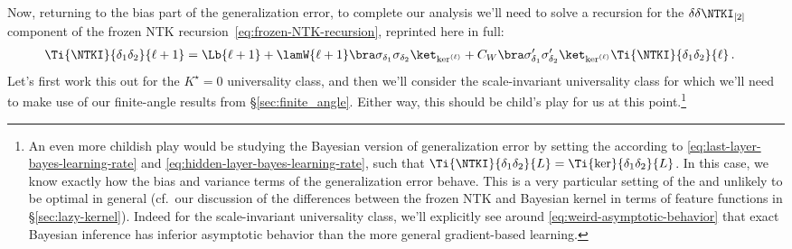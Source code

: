 Now, returning to the bias part of the generalization error, to  complete our analysis we'll need to solve a recursion for the $\delta\delta\NTKI_{[2]}$ component of the frozen NTK recursion~\eqref{eq:frozen-NTK-recursion}, reprinted here in full:
\begin{align}\label{eq:tired-repetition-of-frozen-yogurt} %
\Ti{\NTKI}{\delta_1\delta_2}{\ell+1}&=\Lb{\ell+1} + \lamW{\ell+1}\bra\sigma_{\delta_1}\sigma_{\delta_2}\ket_{\ker^{(\ell)}}+C_W\bra\sigma^{\prime}_{\delta_1}\sigma^{\prime}_{\delta_2}\ket_{\ker^{(\ell)}}\Ti{\NTKI}{\delta_1\delta_2}{\ell}\, .
\end{align}
Let's first work this out for the $K^\star=0$ universality class, and then we'll consider the scale-invariant universality class for which we'll need to make use of our finite-angle results from \S\ref{sec:finite_angle}. 
Either way, this should be child's play for us at this point.\footnote{An even more childish play would be studying the Bayesian version of generalization error by setting the  according to \eqref{eq:last-layer-bayes-learning-rate} and \eqref{eq:hidden-layer-bayes-learning-rate}, such that $\Ti{\NTKI}{\delta_1\delta_2}{L}=\Ti{\ker}{\delta_1\delta_2}{L}$. In this case, we know exactly how the bias and variance terms of the generalization error behave. This is a very particular setting of the  and unlikely to be optimal in general (cf.~our discussion of the differences between the frozen NTK and Bayesian kernel in terms of feature functions in \S\ref{sec:lazy-kernel}). Indeed for the scale-invariant universality class, we'll explicitly see around \eqref{eq:weird-asymptotic-behavior} that exact Bayesian inference has inferior asymptotic behavior than the more general gradient-based learning.}


